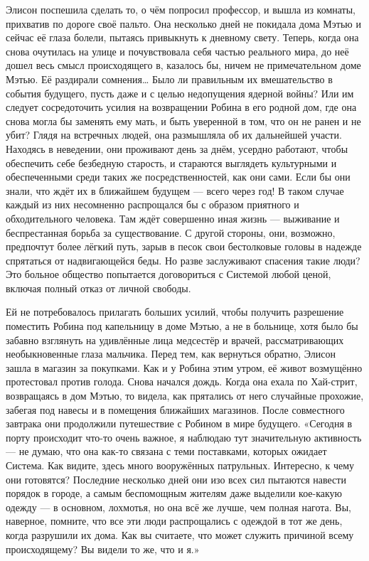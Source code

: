 \documentclass[a4paper,12pt]{book}
\begin{document}
	Элисон поспешила сделать то, о чём попросил профессор, и вышла из комнаты, прихватив по дороге своё пальто. Она несколько дней не покидала дома Мэтью и сейчас её глаза болели, пытаясь привыкнуть к дневному свету. Теперь, когда она снова очутилась на улице и почувствовала себя частью реального мира, до неё дошел весь смысл происходящего в, казалось бы, ничем не примечательном доме Мэтью. Её раздирали сомнения… Было ли правильным их вмешательство в события будущего, пусть даже и с целью недопущения ядерной войны? Или им следует сосредоточить усилия на возвращении Робина в его родной дом, где она снова могла бы заменять ему мать, и быть уверенной в том, что он не ранен и не убит?
	Глядя на встречных людей, она размышляла об их дальнейшей участи. Находясь в неведении, они проживают день за днём, усердно работают, чтобы обеспечить себе безбедную старость, и стараются выглядеть культурными и обеспеченными среди таких же посредственностей, как они сами. Если бы они знали, что ждёт их в ближайшем будущем — всего через год! В таком случае каждый из них несомненно распрощался бы с образом приятного и обходительного человека. Там ждёт совершенно иная жизнь — выживание и беспрестанная борьба за существование. С другой стороны, они, возможно, предпочтут более лёгкий путь, зарыв в песок свои бестолковые головы в надежде спрятаться от надвигающейся беды. Но разве заслуживают спасения такие люди? Это больное общество попытается договориться с Системой любой ценой, включая полный отказ от личной свободы.

	Ей не потребовалось прилагать больших усилий, чтобы получить разрешение поместить Робина под капельницу в доме Мэтью, а не в больнице, хотя было бы забавно взглянуть на удивлённые лица медсестёр и врачей, рассматривающих необыкновенные глаза мальчика.
	Перед тем, как вернуться обратно, Элисон зашла в магазин за покупками.  Как и у Робина этим утром, её живот возмущённо протестовал против голода. Снова начался дождь. Когда она ехала по Хай-стрит, возвращаясь в дом Мэтью, то видела, как прятались от него случайные прохожие, забегая под навесы и в помещения ближайших магазинов.
	После совместного завтрака они продолжили путешествие с Робином в мире будущего.
	«Сегодня в порту происходит что-то очень важное, я наблюдаю тут значительную активность — не думаю, что она как-то связана с теми поставками, которых ожидает Система. Как видите, здесь много вооружённых патрульных. Интересно, к чему они готовятся? Последние несколько дней они изо всех сил пытаются навести порядок в городе, а самым беспомощным жителям даже выделили кое-какую одежду — в основном, лохмотья, но она всё же лучше, чем полная нагота. Вы, наверное, помните, что все эти люди распрощались с одеждой в тот же день, когда разрушили их дома. Как вы считаете, что может служить причиной всему происходящему? Вы видели то же, что и я.»
\end{document}
